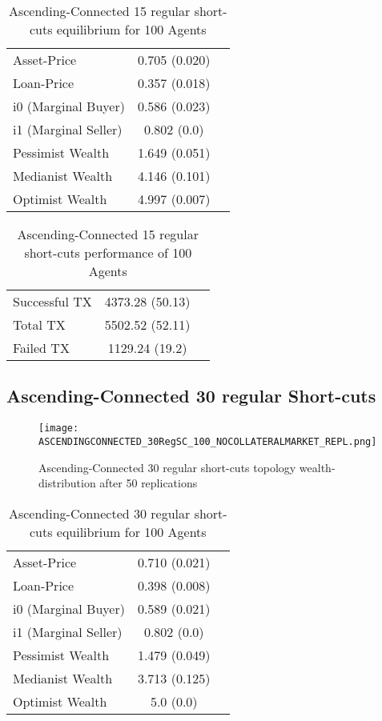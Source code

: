 \documentclass[Bachelorarbeit.tex]{subfiles}
\begin{document}
\begin{table}[!htbp]
	\caption{Ascending-Connected 15 regular short-cuts equilibrium for 100 Agents}
	\centering
	\begin{tabular} { l c r }
		\hline
		Asset-Price & 0.705 (0.020) \\
		Loan-Price & 0.357 (0.018) \\
		i0 (Marginal Buyer) & 0.586 (0.023) \\
		i1 (Marginal Seller) & 0.802 (0.0) \\
		Pessimist Wealth & 1.649 (0.051) \\
		Medianist Wealth & 4.146 (0.101) \\
		Optimist Wealth & 4.997 (0.007) \\
		\hline
	\end{tabular}
\end{table} 

\begin{table}[!htbp]
	\caption{Ascending-Connected 15 regular short-cuts performance of 100 Agents}
	\centering
	\begin{tabular} { l c r }
		\hline
		Successful TX & 4373.28 (50.13) \\
		Total TX & 5502.52 (52.11) \\
		Failed TX & 1129.24 (19.2) \\
		\hline
	\end{tabular}
\end{table}

\subsection{Ascending-Connected 30 regular Short-cuts }
\begin{figure}[!htbp]
	\centering
  \texttt{[image: ASCENDINGCONNECTED\_30RegSC\_100\_NOCOLLATERALMARKET\_REPL.png]}
	\caption{Ascending-Connected 30 regular short-cuts topology wealth-distribution after 50 replications}
	\label{fig1}
\end{figure}

\begin{table}[!htbp]
	\caption{Ascending-Connected 30 regular short-cuts equilibrium for 100 Agents}
	\centering
	\begin{tabular} { l c r }
		\hline
		Asset-Price & 0.710 (0.021) \\
		Loan-Price & 0.398 (0.008) \\
		i0 (Marginal Buyer) & 0.589 (0.021) \\
		i1 (Marginal Seller) & 0.802 (0.0) \\
		Pessimist Wealth & 1.479 (0.049) \\
		Medianist Wealth & 3.713 (0.125) \\
		Optimist Wealth & 5.0 (0.0) \\
		\hline
	\end{tabular}
\end{table} 
\end{document}

